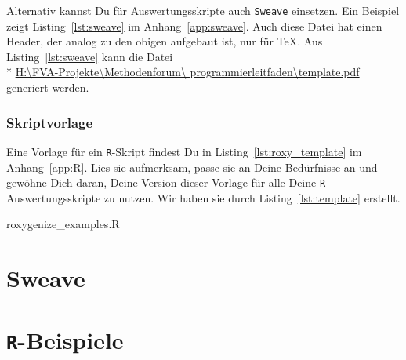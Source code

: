 \documentclass[twoside]{scrartcl}
\providecommand{\R}{\texttt{R}}
\providecommand{\code}[1]{\texttt{#1}}
\begin{document}
 Alternativ kannst Du f\"u{}r 
Auswertungsskripte auch
\href{http://www.stat.uni-muenchen.de/~leisch/Sweave/}{\code{Sweave}} einsetzen.
Ein Beispiel zeigt Listing~\ref{lst:sweave} im
Anhang~\ref{app:sweave}.
Auch diese Datei hat einen Header, der analog zu den obigen aufgebaut ist, nur
f\"u{}r \TeX{}.
Aus  Listing~\ref{lst:sweave} kann die Datei \\* 
\href{%
template.pdf}{%
H:\textbackslash{}FVA-Projekte\textbackslash{}Methodenforum\textbackslash{}%
programmierleitfaden\textbackslash{}template.pdf}  
generiert werden.

\subsubsection{Skriptvorlage
 }
Eine Vorlage f\"ur ein \R{}-Skript findest Du in Listing~\ref{lst:roxy_template}
im Anhang~\ref{app:R}. 
Lies sie aufmerksam, passe sie an Deine Bed\"u{}rfnisse an und gew\"o{}hne Dich
daran, Deine Version dieser Vorlage f\"u{}r alle Deine \R{}-Auswertungsskripte
zu nutzen.
Wir haben sie durch Listing~\ref{lst:template} erstellt.

{roxygenize_examples.R}




\printindex
\appendix
\section{Sweave\label{app:sweave}}

\pagebreak
\section{\R{}-Beispiele\label{app:R}}

%
%
%
\end{document}
